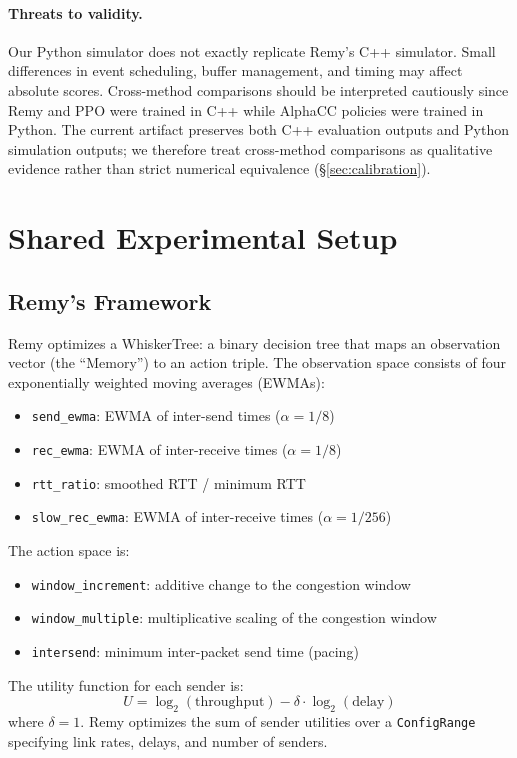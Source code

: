 \paragraph{Threats to validity.}
Our Python simulator does not exactly replicate Remy's C++ simulator. Small
differences in event scheduling, buffer management, and timing may affect
absolute scores. Cross-method comparisons should be interpreted cautiously
since Remy and PPO were trained in C++ while AlphaCC policies were trained in
Python. The current artifact preserves both C++ evaluation outputs and Python
simulation outputs; we therefore treat cross-method comparisons as qualitative
evidence rather than strict numerical equivalence (\S\ref{sec:calibration}).


\section{Shared Experimental Setup}

\subsection{Remy's Framework}

Remy optimizes a WhiskerTree: a binary decision tree that maps an observation
vector (the ``Memory'') to an action triple. The observation space consists of
four exponentially weighted moving averages (EWMAs):
\begin{itemize}
\item \texttt{send\_ewma}: EWMA of inter-send times ($\alpha = 1/8$)
\item \texttt{rec\_ewma}: EWMA of inter-receive times ($\alpha = 1/8$)
\item \texttt{rtt\_ratio}: smoothed RTT / minimum RTT
\item \texttt{slow\_rec\_ewma}: EWMA of inter-receive times ($\alpha = 1/256$)
\end{itemize}

The action space is:
\begin{itemize}
\item \texttt{window\_increment}: additive change to the congestion window
\item \texttt{window\_multiple}: multiplicative scaling of the congestion window
\item \texttt{intersend}: minimum inter-packet send time (pacing)
\end{itemize}

The utility function for each sender is:
\begin{equation}
U = \log_2(\text{throughput}) - \delta \cdot \log_2(\text{delay})
\end{equation}
where $\delta = 1$. Remy optimizes the sum of sender utilities over a
\texttt{ConfigRange} specifying link rates, delays, and number of senders.

